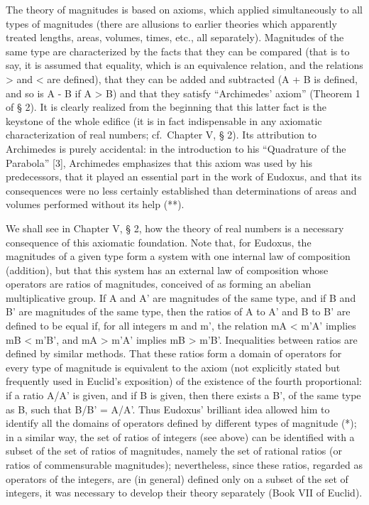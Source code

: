 \begin{enumerate}
  The theory of magnitudes is based on axioms, which applied simultaneously to all types of magnitudes (there are allusions to earlier theories which apparently treated lengths, areas, volumes, times, etc., all separately). Magnitudes of the same type are characterized by the facts that they can be compared (that is to say, it is assumed that equality, which is an equivalence relation, and the relations \textgreater{} and \textless{} are defined), that they can be added and subtracted (A + B is defined, and so is A - B if A \textgreater{} B) and that they satisfy ``Archimedes' axiom'' (Theorem 1 of § 2). It is clearly realized from the beginning that this latter fact is the keystone of the whole edifice (it is in fact indispensable in any axiomatic characterization of real numbers; cf.~Chapter V, § 2). Its attribution to Archimedes is purely accidental: in the introduction to his ``Quadrature of the Parabola'' {[}3{]}, Archimedes emphasizes that this axiom was used by his predecessors, that it played an essential part in the work of Eudoxus, and that its consequences were no less certainly established than determinations of areas and volumes performed without its help (**).
\end{enumerate}

We shall see in Chapter V, § 2, how the theory of real numbers is a necessary consequence of this axiomatic foundation. Note that, for Eudoxus, the magnitudes of a given type form a system with one internal law of composition (addition), but that this system has an external law of composition whose operators are ratios of magnitudes, conceived of as forming an abelian multiplicative group. If A and A' are magnitudes of the same type, and if B and B' are magnitudes of the same type, then the ratios of A to A' and B to B' are defined to be equal if, for all integers m and m', the relation mA \textless{} m'A' implies mB \textless{} m'B', and mA \textgreater{} m'A' implies mB \textgreater{} m'B'. Inequalities between ratios are defined by similar methods. That these ratios form a domain of operators for every type of magnitude is equivalent to the axiom (not explicitly stated but frequently used in Euclid's exposition) of the existence of the fourth proportional: if a ratio A/A' is given, and if B is given, then there exists a B', of the same type as B, such that B/B' = A/A'. Thus Eudoxus' brilliant idea allowed him to identify all the domains of operators defined by different types of magnitude (*); in a similar way, the set of ratios of integers (see above) can be identified with a subset of the set of ratios of magnitudes, namely the set of rational ratios (or ratios of commensurable magnitudes); nevertheless, since these ratios, regarded as operators of the integers, are (in general) defined only on a subset of the set of integers, it was necessary to develop their theory separately (Book VII of Euclid).

